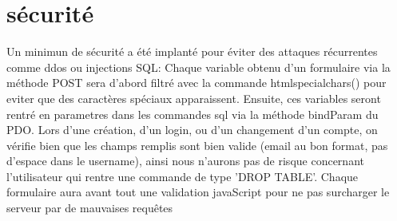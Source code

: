 \section{sécurité}
    Un minimun de sécurité a été implanté pour éviter des attaques récurrentes comme ddos ou injections SQL:\newline
Chaque variable obtenu d'un formulaire via la méthode POST sera d'abord filtré avec la commande htmlspecialchars() pour eviter que des caractères spéciaux apparaissent. Ensuite, ces variables seront rentré en parametres dans les commandes sql via la méthode bindParam du PDO.\newline
Lors d'une création, d'un login, ou d'un changement d'un compte, on vérifie bien que les champs remplis sont bien valide (email au bon format, pas d'espace dans le username), ainsi nous n'aurons pas de risque concernant l'utilisateur qui rentre une commande de type 'DROP TABLE'.\newline
Chaque formulaire aura avant tout une validation javaScript pour ne pas surcharger le serveur par de mauvaises requêtes

